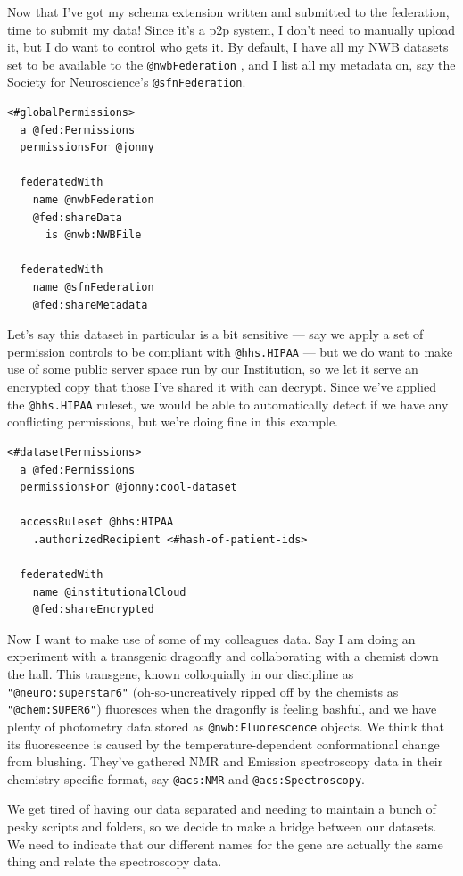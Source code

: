 \documentclass[10pt]{tufte-book}
\begin{document}
Now that I've got my schema extension written and submitted to the
federation, time to submit my data! Since it's a p2p system, I don't
need to manually upload it, but I do want to control who gets it. By
default, I have all my NWB datasets set to be available to the
\texttt{@nwbFederation} , and I list all my metadata on, say the Society
for Neuroscience's \texttt{@sfnFederation}.

\begin{verbatim}
<#globalPermissions>
  a @fed:Permissions
  permissionsFor @jonny

  federatedWith 
    name @nwbFederation
    @fed:shareData 
      is @nwb:NWBFile

  federatedWith
    name @sfnFederation
    @fed:shareMetadata
\end{verbatim}

Let's say this dataset in particular is a bit sensitive --- say we apply
a set of permission controls to be compliant with \texttt{@hhs.HIPAA}
--- but we do want to make use of some public server space run by our
Institution, so we let it serve an encrypted copy that those I've shared
it with can decrypt. Since we've applied the \texttt{@hhs.HIPAA}
ruleset, we would be able to automatically detect if we have any
conflicting permissions, but we're doing fine in this example.

\begin{verbatim}
<#datasetPermissions>
  a @fed:Permissions
  permissionsFor @jonny:cool-dataset

  accessRuleset @hhs:HIPAA
    .authorizedRecipient <#hash-of-patient-ids>
  
  federatedWith
    name @institutionalCloud
    @fed:shareEncrypted
\end{verbatim}

Now I want to make use of some of my colleagues data. Say I am doing an
experiment with a transgenic dragonfly and collaborating with a chemist
down the hall. This transgene, known colloquially in our discipline as
\texttt{"@neuro:superstar6"} (oh-so-uncreatively ripped off by the
chemists as \texttt{"@chem:SUPER6"}) fluoresces when the dragonfly is
feeling bashful, and we have plenty of photometry data stored as
\texttt{@nwb:Fluorescence} objects. We think that its fluorescence is
caused by the temperature-dependent conformational change from blushing.
They've gathered NMR and Emission spectroscopy data in their
chemistry-specific format, say \texttt{@acs:NMR} and
\texttt{@acs:Spectroscopy}.

We get tired of having our data separated and needing to maintain a
bunch of pesky scripts and folders, so we decide to make a bridge
between our datasets. We need to indicate that our different names for
the gene are actually the same thing and relate the spectroscopy data.
\end{document}
